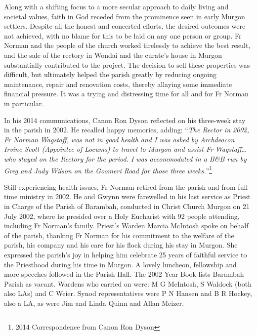 Along with a shifting focus to a more secular approach to daily living and societal values, faith in God receded from the prominence seen in early Murgon settlers. Despite all the honest and concerted efforts, the desired outcomes were not achieved, with no blame for this to be laid on any one person or group. Fr Norman and the people of the church worked tirelessly to achieve the best result, and the sale of the rectory in Wondai and the curate's house in Murgon substantially contributed to the project. The decision to sell these properties was difficult, but ultimately helped the parish greatly by reducing ongoing maintenance, repair and renovation costs, thereby allaying some immediate financial pressure. It was a trying and distressing time for all and for Fr Norman in particular.



In his 2014 communications, Canon Ron Dyson reflected on his three-week stay in the parish in 2002. He recalled happy memories, adding: ``\emph{The Rector in 2002, Fr Norman Wagstaff, was not in good health and I was asked by Archdeacon Irvine Scott (Appointee of Locums) to travel to Murgon and assist Fr Wagstaff\ldots who stayed on the Rectory for the period. I was accommodated in a B\&B run by Greg and Judy Wilson on the Goomeri Road for those three weeks.}''\footnote{2014 Correspondence from Canon Ron Dyson}


Still experiencing health issues, Fr Norman retired from the parish and from full-time ministry in 2002. He and Gwynn were farewelled in his last service as Priest in Charge of the Parish of Barambah, conducted in Christ Church Murgon on 21 July 2002, where he presided over a Holy Eucharist with 92 people attending, including Fr Norman's family. Priest's Warden Marcia McIntosh spoke on behalf of the parish, thanking Fr Norman for his commitment to the welfare of the parish, his company and his care for his flock during his stay in Murgon. She expressed the parish's joy in helping him celebrate 25 years of faithful service to the Priesthood during his time in Murgon. A lovely luncheon, fellowship and more speeches followed in the Parish Hall. The 2002 Year Book lists Barambah Parish as vacant. Wardens who carried on were: M G McIntosh, S Waldock (both also LAs) and C Weier. Synod representatives were P N Hansen and B R Hockey, also a LA, as were Jim and Linda Quinn and Allan Meizer.









